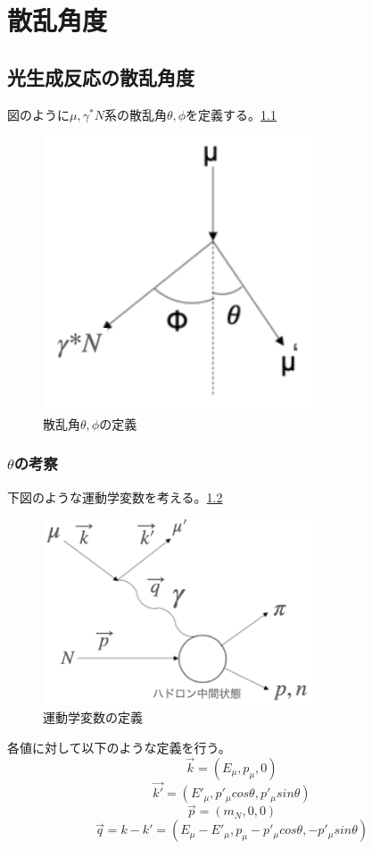 \chapter{散乱角度} \label{cha:angle}
\section{光生成反応の散乱角度}
図のように$\mu,  \gamma^*N$系の散乱角$\theta, \phi$を定義する。\ref{fig:angle1}
\begin{figure}[H]
    \centering
    \includegraphics[width=8cm]{img/angle_diagram.png}
    \caption{散乱角$\theta, \phi$の定義}
    \label{fig:angle1}
\end{figure}

\subsection{$\theta$の考察}
下図のような運動学変数を考える。\ref{fig:angle2}
\begin{figure}[H]
    \centering
    \includegraphics[width=8cm]{img/diagram_3momentum.png}
    \caption{運動学変数の定義}
    \label{fig:angle2}
\end{figure}

各値に対して以下のような定義を行う。
\begin{equation}
    \vec{k} = (E_\mu , p_\mu,0)
\end{equation}
\begin{equation}
    \vec{k'} = (E'_\mu, p'_\mu cos\theta, p'_\mu sin\theta)
\end{equation}
\begin{equation}
    \vec{p} = (m_N, 0, 0)
\end{equation}
\begin{equation}
    \vec{q} = k-k'=(E_\mu - E'_\mu, p_\mu-p'_\mu cos\theta, -p'_\mu sin\theta)
\end{equation}

